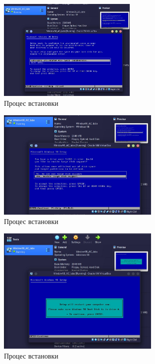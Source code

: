 \begin{figure}[h]
    \centering
    \includegraphics[width=0.6\textwidth]{reports/AC/lab1/assets/3.jpeg}
    \caption{Процес встановки}
\end{figure}

\begin{figure}[h]
    \centering
    \includegraphics[width=0.7\textwidth]{reports/AC/lab1/assets/4.jpeg}
    \caption{Процес встановки}
\end{figure}

\begin{figure}[h]
    \centering
    \includegraphics[width=0.7\textwidth]{reports/AC/lab1/assets/5.jpeg}
    \caption{Процес встановки}
\end{figure}

